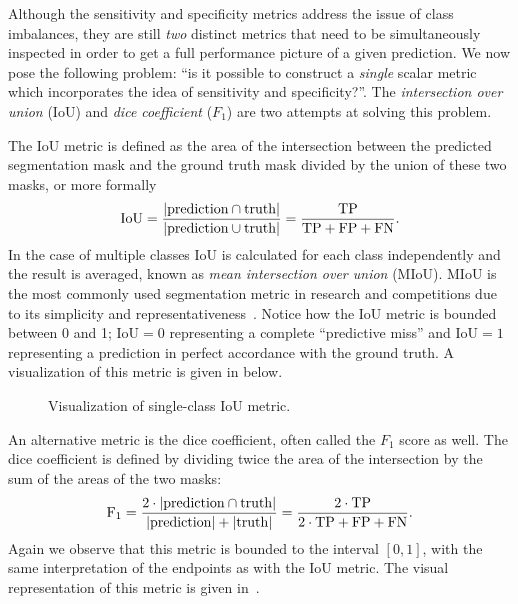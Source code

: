 Although the sensitivity and specificity metrics address the issue of class imbalances, they are still \textit{two} distinct metrics that need to be simultaneously inspected in order to get a full performance picture of a given prediction.
We now pose the following problem: \enquote{is it possible to construct a \textit{single} scalar metric which incorporates the idea of sensitivity and specificity?}.
The \textit{intersection over union} (IoU) and \textit{dice coefficient} ($F_1$) are two attempts at solving this problem.

The IoU metric is defined as the area of the intersection between the predicted segmentation mask and the ground truth mask divided by the union of these two masks, or more formally
%
\begin{equation*}
  \mathrm{IoU}
  =
  \frac{%
    |\mathrm{prediction} \cap \mathrm{truth}|
  }{%
    |\mathrm{prediction} \cup \mathrm{truth}|
  }
  =
  \frac{%
    \mathrm{TP}
  }{%
    \mathrm{TP} + \mathrm{FP} + \mathrm{FN}
  }.
\end{equation*}
%
In the case of multiple classes IoU is calculated for each class independently and the result is averaged, known as \textit{mean intersection over union} (MIoU).
MIoU is the most commonly used segmentation metric in research and competitions due to its simplicity and representativeness~\cite{segmentation-overview}.
Notice how the IoU metric is bounded between 0 and 1; $\mathrm{IoU} = 0$ representing a complete \enquote{predictive miss} and $\mathrm{IoU} = 1$ representing a prediction in perfect accordance with the ground truth.
A visualization of this metric is given in  below.

\begin{figure}[H]
  \centering
  
  \caption{%
    Visualization of single-class IoU metric.
  }%
  \label{fig:iou-metric}
\end{figure}

An alternative metric is the dice coefficient, often called the $F_1$ score as well.
The dice coefficient is defined by dividing twice the area of the intersection by the sum of the areas of the two masks:
%
\begin{equation*}
  \mathrm{F_1}
  =
  \frac{%
    2 \cdot |\mathrm{prediction} \cap \mathrm{truth}|
  }{%
    |\mathrm{prediction}| + |\mathrm{truth}|
  }
  =
  \frac{%
    \mathrm{2 \cdot TP}
  }{%
    2 \cdot \mathrm{TP} + \mathrm{FP} + \mathrm{FN}
  }.
\end{equation*}
%
Again we observe that this metric is bounded to the interval $[0, 1]$, with the same interpretation of the endpoints as with the IoU metric.
The visual representation of this metric is given in~.

